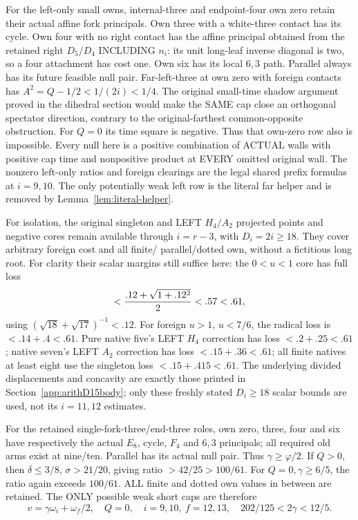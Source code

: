 For the left-only small owns, internal-three and
endpoint-four own zero retain their actual affine
fork principals.
Own three with a white-three contact has its cycle.
Own four with no right contact has the affine
principal obtained from the retained right
\(D_5/D_4\) INCLUDING \(n_i\):
its unit long-leaf inverse diagonal is two,
so a four attachment has cost one.
Own six has its local \(6,3\) path.
Parallel always has its future feasible null pair.
Far-left-three at own zero with foreign contacts
has \(A^2=Q-1/2<1/(2i)<1/4\).
The original small-time shadow argument proved
in the dihedral section would make the SAME cap
close an orthogonal spectator direction, contrary
to the original-farthest common-opposite obstruction.
For \(Q=0\) its time square is negative.
Thus that own-zero row also is impossible.
Every null here is a positive combination of ACTUAL
walls with positive cap time and nonpositive product
at EVERY omitted original wall.
The nonzero left-only ratios and foreign clearings
are the legal shared prefix formulas at \(i=9,10\).
The only potentially weak left row is the literal
far helper and is removed by
Lemma~\ref{lem:literal-helper}.

For isolation, the original singleton and LEFT
\(H_4/A_2\) projected points and negative cores
remain available through \(i=r-3\), with \(D_i=2i\ge18\).
They cover arbitrary foreign cost and all finite/
parallel/dotted own, without a fictitious long root.
For clarity their scalar margins still suffice here:
the \(0<u<1\) core has full loss
\[
             <{.12+\sqrt{1+.12^2}\over2}<.57<.61,
\]
using \((\sqrt{18}+\sqrt{17})^{-1}<.12\).
For foreign \(u>1\), \(u<7/6\), the radical
loss is \(<.14+.4<.61\).
Pure native five's LEFT \(H_4\) correction has
loss \(<.2+.25<.61\);
native seven's LEFT \(A_2\) correction has
loss \(<.15+.36<.61\);
all finite natives at least eight use the
singleton loss \(<.15+.415<.61\).
The underlying divided displacements and concavity
are exactly those printed in
Section~\ref{app:arithD15body};
only these freshly stated \(D_i\ge18\) scalar
bounds are used, not its \(i=11,12\) estimates.

For the retained single-fork-three/end-three roles,
own zero, three, four and six have respectively
the actual \(E_8\), cycle, \(F_4\) and \(6,3\)
principals; all required old arms exist at nine/ten.
Parallel has its actual null pair.
Thus \(\gamma\ge\varphi/2\).
If \(Q>0\), then \(\delta\le3/8\),
\(\sigma>21/20\), giving ratio \(>42/25>100/61\).
For \(Q=0,\gamma\ge6/5\), the ratio again exceeds
\(100/61\).
ALL finite and dotted own values in between
are retained.
The ONLY possible weak short caps are therefore
\[
 v=\gamma\omega_i+\omega_f/2,\quad Q=0,\quad
 i=9,10,\ f=12,13,\quad 202/125<2\gamma<12/5.
\]


